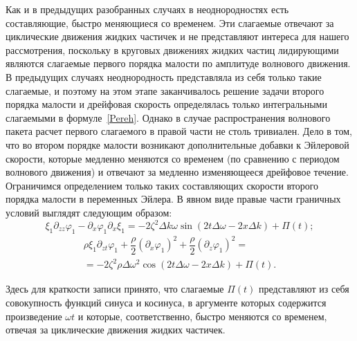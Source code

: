 Как и в предыдущих разобранных случаях в неоднородностях есть составляющие, быстро меняющиеся со временем. Эти слагаемые отвечают за циклические движения жидких частичек и не представляют интереса для нашего рассмотрения, поскольку в круговых движениях жидких частиц лидирующими являются слагаемые первого порядка малости по амплитуде волнового движения. В предыдущих случаях неоднородность представляла из себя только такие слагаемые, и поэтому на этом этапе заканчивалось решение задачи второго порядка малости и дрейфовая скорость определялась только интегральными слагаемыми в формуле~\eqref{Pereh}. Однако в случае распространения волнового пакета расчет первого слагаемого в правой части  не столь тривиален. Дело в том, что во втором порядке малости возникают дополнительные добавки к Эйлеровой скорости, которые медленно меняются со временем (по сравнению с периодом волнового движения) и отвечают за медленно изменяющееся дрейфовое течение. Ограничимся определением только таких составляющих скорости второго порядка малости в переменных Эйлера. В явном виде правые части граничных условий  выглядят следующим образом:
\begin{equation}
\xi_{1}\partial_{zz}\varphi_{1}-\partial_{x}\varphi_{1}\partial_{x}\xi_{1}=-2\zeta^{2}\Delta k \omega \sin \left( 2 t \Delta \omega - 2 x \Delta k \right) + \Pi \left( t \right);
\label{Neodn1}
\end{equation}
\begin{multline}
\rho \xi_{1} \partial_{zt} \varphi_{1}+\dfrac{\rho}{2}\left( \partial_{x}\varphi_{1}\right)^{2}+\dfrac{\rho}{2}\left( \partial_{z}\varphi_{1}\right)^{2}=\\=-2\zeta^{2}\rho \Delta \omega^{2} \cos \left( 2 t \Delta \omega - 2 x \Delta k \right) + \Pi \left( t \right).
\label{Neodn2}
\end{multline}

Здесь для краткости записи принято, что слагаемые $ \Pi \left( t \right) $  представляют из себя совокупность функций синуса и косинуса, в аргументе которых содержится произведение  $ \omega t $ и которые, соответственно, быстро меняются со временем, отвечая за циклические движения жидких частичек.

